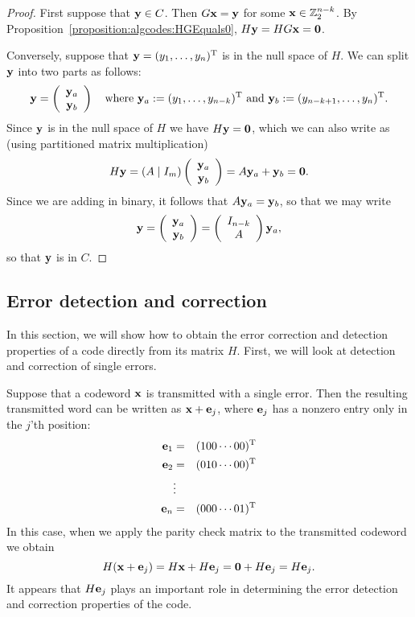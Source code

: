  
\begin{proof}
First suppose that ${\bold y} \in C$. Then $G {\bold x} = {\bold y}$
for some ${\bold x} \in {\Bbb Z}_2^{n-k}$. By Proposition~\ref{proposition:algcodes:HGEquals0}, $H {\bold y} = HG
{\bold x} = {\bold 0}$. 
 
 
Conversely, suppose that ${\bold y} = (y_1, \ldots, y_n)^{\rm T}$ is
in the null space of $H$. We can split ${\bold y}$ into two parts as follows:
\[{\bold y} =  \left(
 \begin{array}{c}
 {\bold y}_a \\
{\bold y}_b
 \end{array} \right) \quad
\mathrm{where~} {\bold y}_a := (y_1, \ldots, y_{n-k})^{\mathrm{T}} \text{ and } {\bold y}_b := (y_{n-k+1}, \ldots, y_n)^{\mathrm{T}}. \]
Since  ${\bold y}$ is in the null space of $H$ we have 
 $H
{\bold y} = {\bold 0}$, which we can also write as (using partitioned matrix multiplication)
\[ H {\bold y} = ( A \mid I_m) \left(
 \begin{array}{c}
 {\bold y}_a \\
{\bold y}_b
 \end{array} \right) = A {\bold y}_a + {\bold y}_b = {\bold 0}.
 \]
Since we are adding in binary, it follows that $A {\bold y}_a = {\bold y}_b$, so that we may write
\[ 
 {\bold y} = \left(
 \begin{array}{c}
 {\bold y}_a \\
{\bold y}_b
 \end{array} \right)
 = \left(
 \begin{array}{c}
 I_{n-k} \\
A
 \end{array} \right) 
 {\bold y}_a,
 \]
so that ${\bold y}$ is in $C$.
\end{proof}
 
 \subsection{Error detection and correction}
 
In this section, we will show how to  obtain the error correction and detection properties of a code directly from its matrix $H$. First, we will look at detection and correction of single errors.

Suppose that a codeword ${\bold x}$ is transmitted with a single error. Then the resulting transmitted word can be written as ${\bold x} + {\bold e}_j$, where ${\bold e}_j$ has a nonzero entry only in the $j$'th position:
\begin{eqnarray*}
{\bold e}_1 & = & (100 \cdots 00)^{\rm T} \\
{\bold e}_2 & = & (010 \cdots 00)^{\rm T} \\
 & \vdots & \\
{\bold e}_n & = & (000 \cdots 01)^{\rm T}
\end{eqnarray*}
In this case, when we apply the parity check matrix to the transmitted codeword we obtain
\[ H({\bold x} + {\bold e}_j) = H{\bold x} + H{\bold e}_j = {\bold 0} + H{\bold e}_j  = H{\bold e}_j. \]
It appears that $H{\bold e}_j$ plays an important role in determining the error detection and correction properties of the code.

